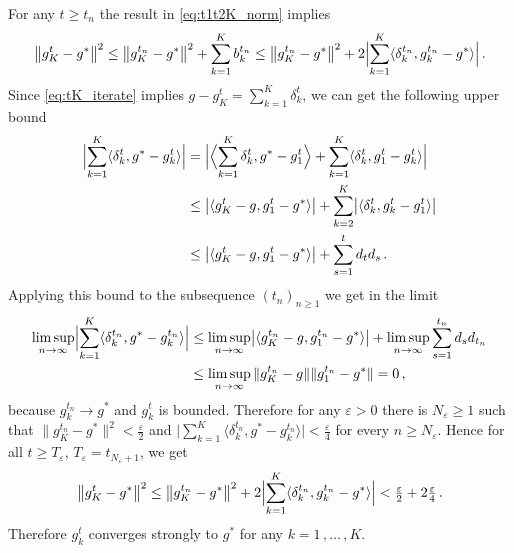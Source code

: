 \documentclass[a4paper]{article}
\begin{document}
For any $t \geq t_n$ the result in \eqref{eq:t1t2K_norm} implies
\begin{equation*}
  \bigl \| g^t_K - g^* \bigr \|^2
    \leq \bigl \| g^{t_n}_K - g^* \bigr \|^2
    + \sum_{k=1}^K b^{t_n}_k
    \leq \bigl \| g^{t_n}_K - g^* \bigr \|^2
    + 2 \Bigl \lvert
        \sum_{k=1}^K \langle \delta^{t_n}_k, g^{t_n}_k - g^* \rangle
      \Bigr \rvert
    \,.
\end{equation*}
Since \eqref{eq:tK_iterate} implies $g - g^t_K = \sum_{k=1}^K \delta^t_k$, we
can get the following upper bound
\begin{align*}
  \Bigl \lvert \sum_{k=1}^K \langle \delta^t_k, g^* - g^t_k \rangle \Bigr \rvert
    &= \Bigl \lvert
      \Bigl\langle \sum_{k=1}^K \delta^t_k, g^* - g^t_1 \Bigr \rangle
      + \sum_{k=1}^K \langle \delta^t_k, g^t_1 - g^t_k \rangle
      \Bigr \rvert
      \\
    &\leq \bigl\lvert \langle g^t_K - g, g^t_1 - g^* \rangle \bigr\rvert 
      + \sum_{k=2}^K \bigl\lvert \langle \delta^t_k, g^t_k - g^t_1 \rangle \bigr\rvert 
      \\
    &\leq \bigl\lvert \langle g^t_K - g, g^t_1 - g^* \rangle \bigr\rvert 
      + \sum_{s=1}^t d_t d_s
      \,.
\end{align*}
Applying this bound to the subsequence $(t_n)_{n\geq1}$ we get in the limit
\begin{align*}
  \limsup_{n\to \infty}
    \Bigl \lvert \sum_{k=1}^K \langle \delta^{t_n}_k, g^* - g^{t_n}_k \rangle \Bigr \rvert
    &\leq \limsup_{n\to \infty}
      \bigl\lvert \langle g^{t_n}_K - g, g^{t_n}_1 - g^* \rangle \bigr\rvert
      + \limsup_{n\to \infty} \sum_{s=1}^{t_n} d_s d_{t_n}
      \\
    &\leq \limsup_{n\to \infty} \|g^{t_n}_K - g\| \|g^{t_n}_1 - g^* \|
      = 0
    \,,
\end{align*}
because $g^{t_n}_k \to g^*$ and $g^t_k$ is bounded. Therefore for any $\varepsilon > 0$
there is $N_\varepsilon \geq 1$ such that $\|g^{t_n}_K - g^*\|^2 < \tfrac\varepsilon2$
and $\lvert \sum_{k=1}^K \langle \delta^{t_n}_k, g^* - g^{t_n}_k \rangle \rvert <
\tfrac\varepsilon4$ for every $n \geq N_\varepsilon$. Hence for all $t \geq T_\varepsilon$,
$T_\varepsilon = t_{N_\varepsilon + 1}$, we get
\begin{equation*}
  \bigl \| g^t_K - g^* \bigr \|^2
    \leq \bigl \| g^{t_n}_K - g^* \bigr \|^2
    + 2 \Bigl \lvert
        \sum_{k=1}^K \langle \delta^{t_n}_k, g^{t_n}_k - g^* \rangle
      \Bigr \rvert
    < \tfrac\varepsilon2 + 2 \tfrac\varepsilon4
    \,.
\end{equation*}
Therefore $g^t_k$ converges strongly to $g^*$ for any $k=1\,, \ldots\,,K$.
\end{document}
